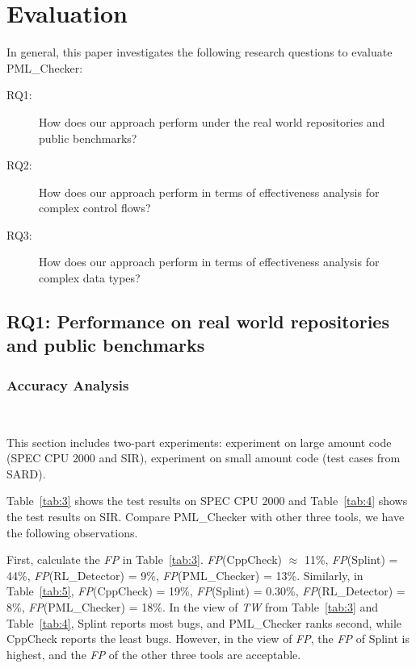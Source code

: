 \section{Evaluation}\label{sec:evaluation}

In general, this paper investigates the following research questions to evaluate PML\_Checker:
\begin{description}
\item[RQ1:] How does our approach perform under the real world repositories and public benchmarks? 
\item[RQ2:] How does our approach perform in terms of effectiveness analysis for complex control flows? 
\item[RQ3:] How does our approach perform in terms of effectiveness analysis for complex data types? 
\end{description}

\subsection{RQ1: Performance on real world repositories and public benchmarks}


\subsubsection{Accuracy Analysis}

\ 

This section includes two-part experiments: experiment on large amount code (SPEC CPU $2000$ and SIR), experiment on small amount code (test cases from SARD).

Table~\ref{tab:3} shows the test results on SPEC CPU $2000$ and Table~\ref{tab:4} shows the test results on SIR. Compare PML\_Checker with other three tools, we have the following observations. 

First, calculate the \textit{FP} in Table~\ref{tab:3}. \textit{FP}(CppCheck) $\approx$ 11\%, \textit{FP}(Splint) = 44\%, \textit{FP}(RL\_Detector) = 9\%, \textit{FP}(PML\_Checker) = 13\%. Similarly, in Table~\ref{tab:5}, \textit{FP}(CppCheck) = 19\%, \textit{FP}(Splint) = 0.30\%, \textit{FP}(RL\_Detector) = 8\%, \textit{FP}(PML\_Checker) = 18\%.
In the view of \textit{TW} from Table~\ref{tab:3} and Table~\ref{tab:4}, Splint reports most bugs, and PML\_Checker ranks second, while CppCheck reports the least bugs. However, in the view of \textit{FP}, the \textit{FP} of Splint is highest, and the \textit{FP} of the other three tools are acceptable.


